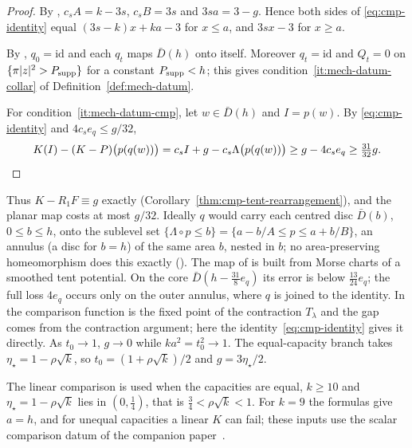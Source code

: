 \begin{proof}
By , $c_sA=k-3s$, $c_sB=3s$ and $3sa=3-g$. Hence both sides of \eqref{eq:cmp-identity} equal $(3s-k)x+ka-3$ for $x\le a$, and $3sx-3$ for $x\ge a$.

By , $q_0=\mathrm{id}$ and each $q_t$ maps $\bar D(h)$ onto itself. Moreover $q_t=\mathrm{id}$ and $Q_t=0$ on $\{\pi|z|^2>P_{\rm supp}\}$ for a constant $P_{\rm supp}<h$; this gives condition~\ref{it:mech-datum-collar} of Definition~\ref{def:mech-datum}.

For condition~\ref{it:mech-datum-cmp}, let $w\in\bar D(h)$ and $I=p(w)$. By \eqref{eq:cmp-identity} and $4c_se_q\le g/32$,
\[
K(I)-(K-P)\bigl(p(q(w))\bigr)=c_sI+g-c_s\Lambda\bigl(p(q(w))\bigr)\ge g-4c_se_q\ge\tfrac{31}{32}g .\qedhere
\]
\end{proof}

Thus $K-R_1F\equiv g$ exactly (Corollary~\ref{thm:cmp-tent-rearrangement}), and the planar map costs at most $g/32$. Ideally $q$ would carry each centred disc $\bar D(b)$, $0\le b\le h$, onto the sublevel set
$\{\Lambda\circ p\le b\}=\{a-b/A\le p\le a+b/B\}$, an annulus (a disc for $b=h$) of the same area $b$, nested in $b$; no
area-preserving homeomorphism does this exactly (). The map of  is
built from Morse charts of a smoothed tent potential. On the core $\bar D(h-\frac{31}8e_q)$ its error is below
$\frac{13}{24}e_q$; the full loss $4e_q$ occurs only on the outer annulus, where $q$ is joined to the identity.
In \cite{OpenAI2026} the comparison function is the fixed point of the contraction $T_\lambda$ and the gap comes from
the contraction argument; here the identity~\eqref{eq:cmp-identity} gives it directly. As $t_0\to1$, $g\to0$ while
$ka^2=t_0^2\to1$. The equal-capacity branch takes $\eta_\star=1-\rho\sqrt k$, so $t_0=(1+\rho\sqrt k)/2$ and
$g=3\eta_\star/2$.

\begin{remark}\label{rem:cmp-small-k}
The linear comparison is used when the capacities are equal, $k\ge10$ and $\eta_\star=1-\rho\sqrt k$ lies in
$(0,\frac14)$, that is $\frac34<\rho\sqrt k<1$. For $k=9$ the formulas give $a=h$, and for unequal capacities a
linear $K$ can fail; these inputs use the scalar comparison datum of the companion paper~\cite{SongHD}.
\end{remark}
